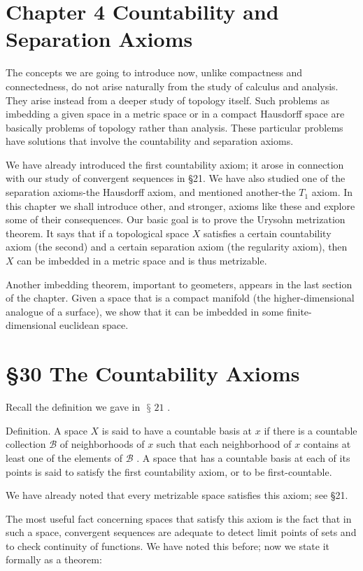 \documentclass[10pt]{article}
\begin{document}
\section*{Chapter 4 Countability and Separation Axioms}

The concepts we are going to introduce now, unlike compactness and connectedness, do not arise naturally from the study of calculus and analysis. They arise instead from a deeper study of topology itself. Such problems as imbedding a given space in a metric space or in a compact Hausdorff space are basically problems of topology rather than analysis. These particular problems have solutions that involve the countability and separation axioms.

We have already introduced the first countability axiom; it arose in connection with our study of convergent sequences in §21. We have also studied one of the separation axioms-the Hausdorff axiom, and mentioned another-the \({T}_{1}\) axiom. In this chapter we shall introduce other, and stronger, axioms like these and explore some of their consequences. Our basic goal is to prove the Urysohn metrization theorem. It says that if a topological space \(X\) satisfies a certain countability axiom (the second) and a certain separation axiom (the regularity axiom), then \(X\) can be imbedded in a metric space and is thus metrizable.

Another imbedding theorem, important to geometers, appears in the last section of the chapter. Given a space that is a compact manifold (the higher-dimensional analogue of a surface), we show that it can be imbedded in some finite-dimensional euclidean space.

\section*{§30 The Countability Axioms}

Recall the definition we gave in \(\text{ § }{21}\) .

Definition. A space \(X\) is said to have a countable basis at \(x\) if there is a countable collection \(\mathcal{B}\) of neighborhoods of \(x\) such that each neighborhood of \(x\) contains at least one of the elements of \(\mathcal{B}\) . A space that has a countable basis at each of its points is said to satisfy the first countability axiom, or to be first-countable.

We have already noted that every metrizable space satisfies this axiom; see §21.

The most useful fact concerning spaces that satisfy this axiom is the fact that in such a space, convergent sequences are adequate to detect limit points of sets and to check continuity of functions. We have noted this before; now we state it formally as a theorem:
\end{document}
